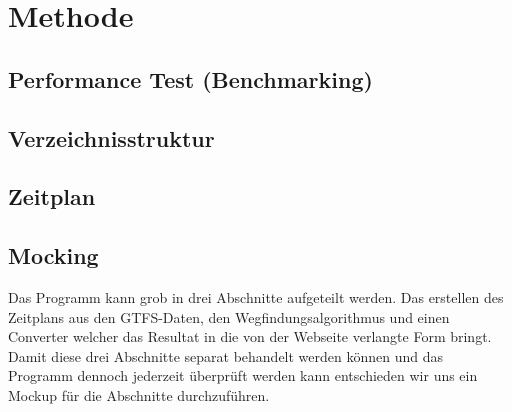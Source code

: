 \section{Methode}

\subsection{Performance Test (Benchmarking)}

\subsection{Verzeichnisstruktur}

\subsection{Zeitplan}

\subsection{Mocking}
Das Programm kann grob in drei Abschnitte aufgeteilt werden. Das erstellen des Zeitplans aus den GTFS-Daten, den Wegfindungsalgorithmus und einen Converter welcher das Resultat in die von der Webseite verlangte Form bringt. Damit diese drei Abschnitte separat behandelt werden können und das Programm dennoch jederzeit überprüft werden kann entschieden wir uns ein Mockup für die Abschnitte durchzuführen.


